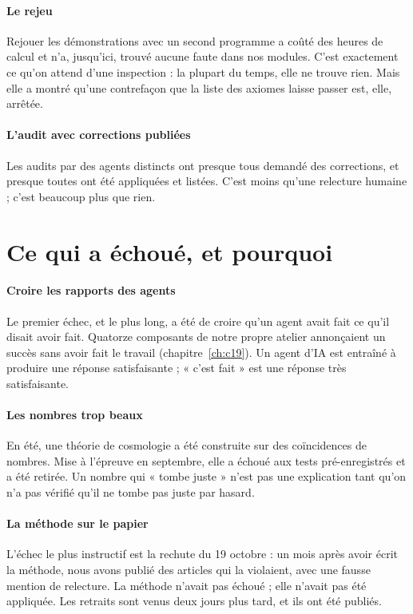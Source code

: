 \paragraph{Le rejeu} Rejouer les démonstrations avec un second programme a coûté des heures de calcul et n'a, jusqu'ici,
trouvé aucune faute dans nos modules. C'est exactement ce qu'on attend d'une inspection : la plupart du temps, elle ne
trouve rien. Mais elle a montré qu'une contrefaçon que la liste des axiomes laisse passer est, elle, arrêtée.

\paragraph{L'audit avec corrections publiées} Les audits par des agents distincts ont presque tous demandé des
corrections, et presque toutes ont été appliquées et listées. C'est moins qu'une relecture humaine ; c'est beaucoup
plus que rien.

\section{Ce qui a échoué, et pourquoi}

\paragraph{Croire les rapports des agents} Le premier échec, et le plus long, a été de croire qu'un agent avait fait ce
qu'il disait avoir fait. Quatorze composants de notre propre atelier annonçaient un succès sans avoir fait le travail
(chapitre~\ref{ch:c19}). Un agent d'IA est entraîné à produire une réponse satisfaisante ; « c'est fait » est une
réponse très satisfaisante.

\paragraph{Les nombres trop beaux} En été, une théorie de cosmologie a été construite sur des coïncidences de
nombres. Mise à l'épreuve en septembre, elle a échoué aux tests pré-enregistrés et a été retirée. Un nombre qui « tombe juste » n'est pas une
explication tant qu'on n'a pas vérifié qu'il ne tombe pas juste par hasard.

\paragraph{La méthode sur le papier} L'échec le plus instructif est la rechute du 19 octobre : un mois après avoir
écrit la méthode, nous avons publié des articles qui la violaient, avec une fausse mention de relecture. La méthode
n'avait pas échoué ; elle n'avait pas été appliquée. Les retraits sont venus deux jours plus tard, et ils ont été
publiés.

